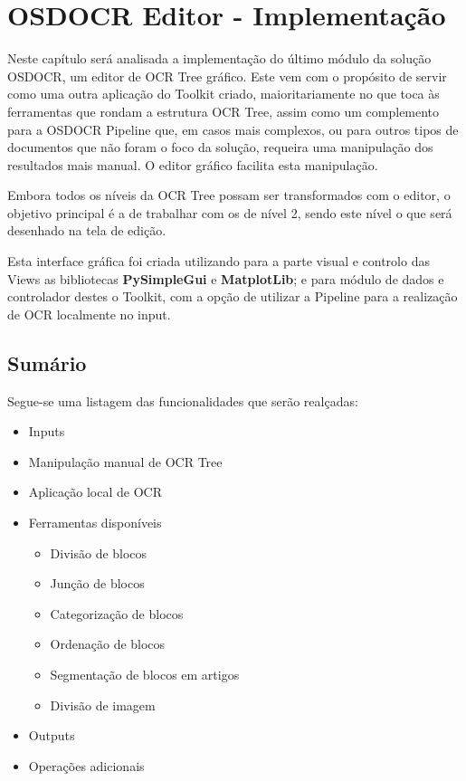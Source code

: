 \chapter{OSDOCR Editor - Implementação}
\label{cap_osdocr_editor_implementacao}



Neste capítulo será analisada a implementação do último módulo da solução OSDOCR, um editor de OCR Tree gráfico. Este vem com o propósito de servir como uma outra aplicação do Toolkit criado, maioritariamente no que toca às ferramentas que rondam a estrutura OCR Tree, assim como um complemento para a OSDOCR Pipeline que, em casos mais complexos, ou para outros tipos de documentos que não foram o foco da solução, requeira uma manipulação dos resultados mais manual. O editor gráfico facilita esta manipulação.

Embora todos os níveis da OCR Tree possam ser transformados com o editor, o objetivo principal é a de trabalhar com os de nível 2, sendo este nível o que será desenhado na tela de edição.

Esta interface gráfica foi criada utilizando para a parte visual e controlo das Views as bibliotecas \textbf{PySimpleGui} e \textbf{MatplotLib}; e para módulo de dados e controlador destes o Toolkit, com a opção de utilizar a Pipeline para a realização de OCR localmente no input.


\section{Sumário}

Segue-se uma listagem das funcionalidades que serão realçadas:

\begin{itemize}\setlength\itemsep{-0.8em}
	
	\item Inputs
	\item Manipulação manual de OCR Tree 
	\item Aplicação local de OCR
	\item Ferramentas disponíveis
		\begin{itemize}\setlength\itemsep{-0.8em}
			\item Divisão de blocos
			\item Junção de blocos
			\item Categorização de blocos
			\item Ordenação de blocos
			\item Segmentação de blocos em artigos
			\item Divisão de imagem
		\end{itemize}
	\item Outputs
	\item Operações adicionais
\end{itemize}


